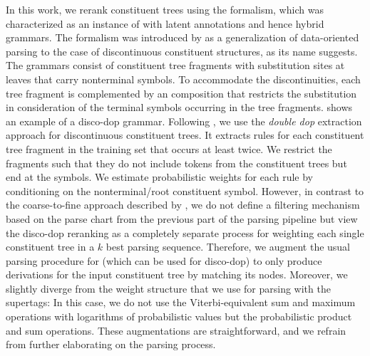 \documentclass[../../document.tex]{subfiles}
\begin{document}
    In this work, we rerank constituent trees using the  formalism, which was characterized as an instance of  with latent annotations \citep[cf.\@ section~4]{Cra11} and hence hybrid grammars. \citep[cf.\@ section~8.5.1]{Geb20}
    The formalism was introduced by \citet{Cra11} as a generalization of data-oriented parsing \citep{Bod92} to the case of discontinuous constituent structures, as its name suggests.
    The grammars consist of constituent tree fragments with substitution sites at leaves that carry nonterminal symbols.
    To accommodate the discontinuities, each tree fragment is complemented by an  composition that restricts the substitution in consideration of the terminal symbols occurring in the tree fragments.
     shows an example of a disco-dop grammar.
    Following \citet{San11,Cra11}, we use the \emph{double dop} extraction approach for discontinuous constituent trees.
    It extracts rules for each constituent tree fragment in the training set that occurs at least twice.
    We restrict the fragments such that they do not include tokens from the constituent trees but end at the  symbols.
    We estimate probabilistic weights for each rule by conditioning on the  nonterminal/root constituent symbol.
    However, in contrast to the coarse-to-fine approach described by \citet{Cra11}, we do not define a filtering mechanism based on the parse chart from the previous part of the parsing pipeline but view the disco-dop reranking as a completely separate process for weighting each single constituent tree in a \(k\) best parsing sequence.
    Therefore, we augment the usual parsing procedure for  (which can be used for disco-dop) to only produce derivations for the input constituent tree by matching its nodes.
    Moreover, we slightly diverge from the weight structure that we use for parsing with the supertags:
        In this case, we do not use the Viterbi-equivalent sum and maximum operations with logarithms of probabilistic values but the probabilistic product and sum operations.
    These augmentations are straightforward, and we refrain from further elaborating on the parsing process.
    
\end{document}
